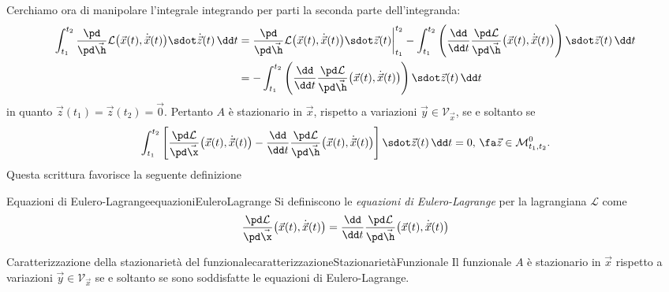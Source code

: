 Cerchiamo ora di manipolare l'integrale integrando per parti la seconda parte dell'integranda:
\[
	\begin{split}
		\int_{t_1}^{t_2} \frac{\pd}{\pd \vec{\h}}\mathcal{L}\big(\vec{x}(t),\dot{\vec{x}}(t)\big) \sdot \dot{\vec{z}}(t)\,\dd t & = \frac{\pd}{\pd \vec{\h}}\mathcal{L}\big(\vec{x}(t),\dot{\vec{x}}(t)\big) \sdot \vec{z}(t)\bigg|_{t_1}^{t_2} - \int_{t_1}^{t_2} \left(\frac{\dd}{\dd t}\frac{\pd\mathcal{L}}{\pd\vec{\h}}\big(\vec{x}(t),\dot{\vec{x}}(t)\big)\right)\sdot\vec{z}(t)\,\dd t\\
		& = - \int_{t_1}^{t_2} \left(\frac{\dd}{\dd t}\frac{\pd\mathcal{L}}{\pd\vec{\h}}\big(\vec{x}(t),\dot{\vec{x}}(t)\big)\right)\sdot\vec{z}(t)\,\dd t
	\end{split}
\]
in quanto \(\vec{z}(t_1)=\vec{z}(t_2)=\vec{0}\).
Pertanto \(A\) è stazionario in \(\vec{x}\), rispetto a variazioni \(\vec{y}\in \mathcal{V}_{\vec{x}}\), se e soltanto se
\[
	\int_{t_1}^{t_2}\left[\frac{\pd \mathcal{L}}{\pd\vec{\x}}\big(\vec{x}(t),\dot{\vec{x}}(t)\big) - \frac{\dd}{\dd t}\frac{\pd \mathcal{L}}{\pd\vec{\h}}\big(\vec{x}(t),\dot{\vec{x}}(t)\big)\right]\sdot \vec{z}(t)\,\dd t = 0, \,\fa \vec{z} \in \mathcal{M}_{t_1,t_2}^0.
\]
Questa scrittura favorisce la seguente definizione

\begin{defn}{Equazioni di Eulero-Lagrange}{equazioniEuleroLagrange}
	Si definiscono le \emph{equazioni di Eulero-Lagrange} per la lagrangiana \(\mathcal{L}\) come
	\[
		\frac{\pd \mathcal{L}}{\pd\vec{\x}}\big(\vec{x}(t),\dot{\vec{x}}(t)\big) = \frac{\dd}{\dd t}\frac{\pd \mathcal{L}}{\pd\vec{\h}}\big(\vec{x}(t),\dot{\vec{x}}(t)\big)
	\]
\end{defn}

\begin{teor}{Caratterizzazione della stazionarietà del funzionale}{caratterizzazioneStazionarietàFunzionale}
	Il funzionale \(A\) è stazionario in \(\vec{x}\) rispetto a variazioni \(\vec{y}\in\mathcal{V}_{\vec{x}}\) se e soltanto se sono soddisfatte le equazioni di Eulero-Lagrange.
\end{teor}

